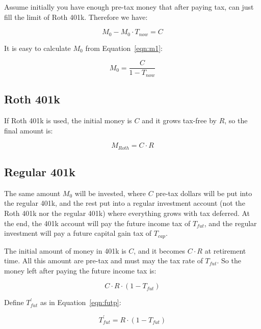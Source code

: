 \documentclass[twocolumn]{article}
\begin{document}
Assume initially you have enough pre-tax money that after paying tax, can just fill the
limit of Roth 401k. Therefore we have:

\begin{equation}
  M_{0} - M_{0} \cdot T_{now} = C \label{eqn:m0}
\end{equation}

It is easy to calculate $M_{0}$ from Equation~\ref{eqn:m1}:

\begin{equation}
  M_{0} = \frac{C}{1 - T_{now}} \label{eqn:m1}
\end{equation}

\subsection{Roth 401k}

If Roth 401k is used, the initial money is $C$ and it grows tax-free by $R$, so the final
amount is:

\begin{equation}
  M_{Roth}= C \cdot R \label{eqn:roth2}
\end{equation}

\subsection{Regular 401k}

The same amount $M_{0}$ will be invested, where $C$ pre-tax dollars will be put
into the regular 401k, and the rest put into a regular investment account (not
the Roth 401k nor the regular 401k) where everything grows with tax deferred. At
the end, the 401k account will pay the future income tax of $T_{fut}$, and the
regular investment will pay a future capital gain tax of $T_{cap}$.

The initial amount of money in 401k is $C$, and it becomes $C \cdot R$ at
retirement time. All this amount are pre-tax and must may the tax rate of
$T_{fut}$. So the money left after paying the
future income tax is:

\begin{equation}
  C \cdot R \cdot (1 - T_{fut}) \label{eqn:401konly}
\end{equation}

Define $T_{fut}^{\prime}$ as in Equation~\ref{eqn:futp}:

\begin{equation}
  T_{fut}^{\prime} = R \cdot (1 - T_{fut}) \label{eqn:futp}
\end{equation}
\end{document}
